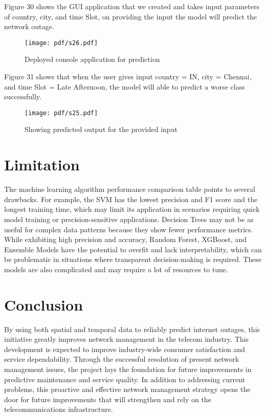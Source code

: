 Figure 30 shows the GUI application that we created and takes input parameters of  country, city, and time Slot, on providing the input the model will predict the network outage. 
\begin{figure}[ht!]
  \raggedright
  \texttt{[image: pdf/s26.pdf]}
  \vspace{0pt}
  \caption{\textbf{ }Deployed console application for prediction}
\end{figure}

Figure 31 shows that when the user gives input country = IN, city = Chennai, and time Slot = Late Afternoon, the model will able to predict a worse class successfully.  
\begin{figure}[ht!]
  \raggedright
  \texttt{[image: pdf/s25.pdf]}
  \vspace{0pt}
  \caption{\textbf{ }Showing predicted output for the provided input}
\end{figure}
\section*{Limitation}

The machine learning algorithm performance comparison table points to several drawbacks. For example, the SVM has the lowest precision and F1 score and the longest training time, which may limit its application in scenarios requiring quick model training or precision-sensitive applications. Decision Trees may not be as useful for complex data patterns because they show fewer performance metrics. While exhibiting high precision and accuracy, Random Forest, XGBoost, and Ensemble Models have the potential to overfit and lack interpretability, which can be problematic in situations where transparent decision-making is required. These models are also complicated and may require a lot of resources to tune.

\section*{Conclusion}

By using both spatial and temporal data to reliably predict internet outages, this initiative greatly improves network management in the telecom industry. This development is expected to improve industry-wide consumer satisfaction and service dependability. Through the successful resolution of present network management issues, the project lays the foundation for future improvements in predictive maintenance and service quality. In addition to addressing current problems, this proactive and effective network management strategy opens the door for future improvements that will strengthen and rely on the telecommunications infrastructure.

